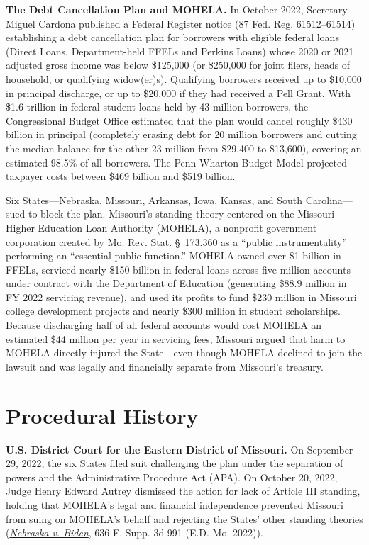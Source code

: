 \documentclass[12pt]{article}
\begin{document}
\textbf{The Debt Cancellation Plan and MOHELA.} In October 2022, Secretary Miguel Cardona published a Federal Register notice (87 Fed. Reg. 61512--61514) establishing a debt cancellation plan for borrowers with eligible federal loans (Direct Loans, Department-held FFELs and Perkins Loans) whose 2020 or 2021 adjusted gross income was below \$125,000 (or \$250,000 for joint filers, heads of household, or qualifying widow(er)s). Qualifying borrowers received up to \$10,000 in principal discharge, or up to \$20,000 if they had received a Pell Grant. With \$1.6 trillion in federal student loans held by 43 million borrowers, the Congressional Budget Office estimated that the plan would cancel roughly \$430 billion in principal (completely erasing debt for 20 million borrowers and cutting the median balance for the other 23 million from \$29,400 to \$13,600), covering an estimated 98.5\% of all borrowers. The Penn Wharton Budget Model projected taxpayer costs between \$469 billion and \$519 billion.

Six States---Nebraska, Missouri, Arkansas, Iowa, Kansas, and South Carolina---sued to block the plan. Missouri's standing theory centered on the Missouri Higher Education Loan Authority (MOHELA), a nonprofit government corporation created by \href{https://revisor.mo.gov/main/PageSelect.aspx?section=173.360&bid=8823}{Mo. Rev. Stat. \S~173.360} as a ``public instrumentality'' performing an ``essential public function.'' MOHELA owned over \$1 billion in FFELs, serviced nearly \$150 billion in federal loans across five million accounts under contract with the Department of Education (generating \$88.9 million in FY 2022 servicing revenue), and used its profits to fund \$230 million in Missouri college development projects and nearly \$300 million in student scholarships. Because discharging half of all federal accounts would cost MOHELA an estimated \$44 million per year in servicing fees, Missouri argued that harm to MOHELA directly injured the State---even though MOHELA declined to join the lawsuit and was legally and financially separate from Missouri's treasury.

\section{Procedural History}

\textbf{U.S. District Court for the Eastern District of Missouri.} On September 29, 2022, the six States filed suit challenging the plan under the separation of powers and the Administrative Procedure Act (APA). On October 20, 2022, Judge Henry Edward Autrey dismissed the action for lack of Article III standing, holding that MOHELA's legal and financial independence prevented Missouri from suing on MOHELA's behalf and rejecting the States' other standing theories (\href{https://clearinghouse.net/case/43874/}{\textit{Nebraska v. Biden}}, 636 F. Supp. 3d 991 (E.D. Mo. 2022)).
\end{document}
